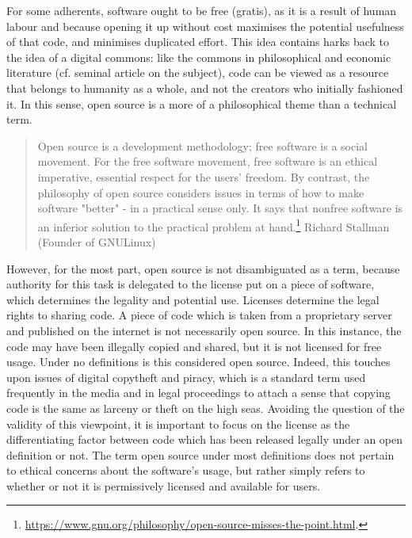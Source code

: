 For some adherents, software ought to be free (gratis), as it is a result of human labour and because opening it up without cost maximises the potential usefulness of that code, and minimises duplicated effort. This idea contains harks back to the idea of a digital commons: like the commons in philosophical and economic literature (cf.  seminal article on the subject), code can be viewed as a resource that belongs to humanity as a whole, and not the creators who initially fashioned it. In this sense, open source is a more of a philosophical theme than a technical term.

\begin{quote}
Open source is a development methodology; free software is a social movement. For the free software movement, free software is an ethical imperative, essential respect for the users' freedom. By contrast, the philosophy of open source considers issues in terms of how to make software  "better" - in a practical sense only. It says that nonfree software is an inferior solution to the practical problem at hand.\footnote{\href{https://www.gnu.org/philosophy/open-source-misses-the-point.html}{https://www.gnu.org/philosophy/open-source-misses-the-point.html}. }
\signed Richard Stallman (Founder of GNU\/Linux)
\end{quote}

However, for the most part, open source is not disambiguated as a term, because authority for this task is delegated to the license put on a piece of software, which determines the legality and potential use. Licenses determine the legal rights to sharing code. A piece of code which is taken from a proprietary server and published on the internet is not necessarily open source. In this instance, the code may have been illegally copied and shared, but it is not licensed for free usage. Under no definitions is this considered open source. Indeed, this touches upon issues of digital copytheft and piracy, which is a standard term used frequently in the media and in legal proceedings to attach a sense that copying code is the same as larceny or theft on the high seas. Avoiding the question of the validity of this viewpoint, it is important to focus on the license as the differentiating factor between code which has been released legally under an open definition or not. The term open source under most definitions does not pertain to ethical concerns about the software's usage, but rather simply refers to whether or not it is permissively licensed and available for users.

